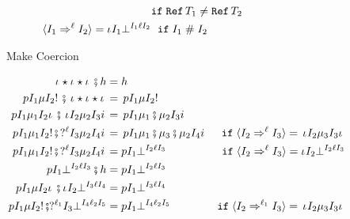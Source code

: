 \documentclass[acmtog, authorversion, acmlarge]{acmart}
\begin{document}
\begin{figure}[tbh]
\begin{subfigure}{.5\textwidth}
\begin{align*}
            & \hspace{5.3em} \texttt{if} \; %
            \Ref{\T_1} \neq \Ref{\T_2} \\
      \mkcrcn{\I_1}{\I_2} &= \hcfail{\pmt}{\I_1}{\I_1}{\Lbl}{\I_2} %
      \hspace{.6em} \texttt{if} \; \I_1 \sic \I_2
    \end{align*}
    \caption{Make Coercion}
    \label{fig:hcMakeCoercion}
  \end{subfigure}
  \begin{subfigure}{.5\textwidth}
    \begin{align*}
      \cmp{\hc{\pmt}{\Dyn}{\id}{\Dyn}{\imt}}{\HC} &= \HC \\
      \cmp{\hc{\Prj}{\I_1}{\Med}{\I_2}{\inj}} %
          {\hc{\pmt}{\Dyn}{\id}{\Dyn}{\imt}} %
      &=  \hc{\Prj}{\I_1}{\Med}{\I_2}{\inj} \\
      \cmp{\hc{\Prj}{\I_1}{\Med_1}{\I_2}{\imt}} %
          {\hc{\pmt}{\I_2}{\Med_2}{\I_3}{\Inj}} %
      &=  \hc{\Prj}{\I_1}{\cmpm{\Med_1}{\Med_2}}{\I_3}{\Inj} \\
      \cmp{\hc{\Prj}{\I_1}{\Med_1}{\I_2}{\inj}} %
          {\hc{\prj{\Lbl}}{\I_3}{\Med_2}{\I_4}{\Inj}} %
      &=  \hc{\Prj}{\I_1}{\cmpm{\cmpm{\Med_1}{\Med_3}}{\Med_2}}{\I_4}{\Inj} %
          & \texttt{if} \;
          \mkcrcn{\I_2}{\I_3} = \hc{\pmt}{\I_2}{\Med_3}{\I_3}{\imt}   \\
          \cmp{\hc{\Prj}{\I_1}{\Med_1}{\I_2}{\inj}} %
          {\hc{\prj{\Lbl}}{\I_3}{\Med_2}{\I_4}{\Inj}} %
      &= \hcfail{\Prj}{\I_1}{\I_2}{\Lbl}{\I_3} %
          & \texttt{if} \;
          \mkcrcn{\I_2}{\I_3} = \hcfail{\pmt}{\I_2}{\I_2}{\Lbl}{\I_3}   \\
      \cmp{\hcfail{\Prj}{\I_1}{\I_2}{\Lbl}{\I_3}} %
          {\HC} %
      &=  \hcfail{\Prj}{\I_1}{\I_2}{\Lbl}{\I_3} \\
      \cmp{\hc{\Prj}{\I_1}{\Med}{\I_2}{\imt}} %
          {\hcfail{\pmt}{\I_2}{\I_3}{\Lbl}{\I_4}} %
      &=  \hcfail{\Prj}{\I_1}{\I_3}{\Lbl}{\I_4} \\
      \cmp{\hc{\Prj}{\I_1}{\Med}{\I_2}{\inj}} %
          {\hcfail{\prj{\Lbl_1}}{\I_3}{\I_4}{\Lbl_2}{\I_5}} %
      &=  \hcfail{\Prj}{\I_1}{\I_4}{\Lbl_2}{\I_5} %
          & \texttt{if} \;
          \mkcrcn[\Lbl_1]{\I_2}{\I_3} = \hc{\pmt}{\I_2}{\Med_3}{\I_3}{\imt} \\

\end{align*}
\end{subfigure}
\end{figure}
\end{document}
